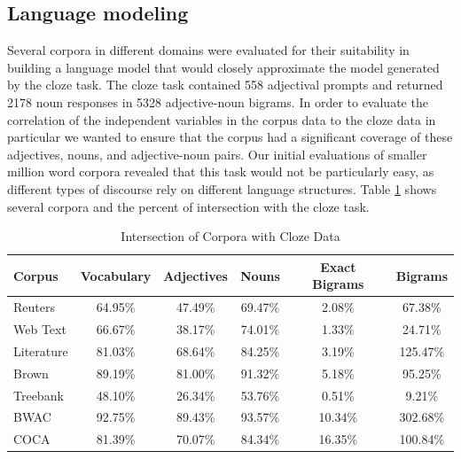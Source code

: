 \documentclass{article}
\begin{document}
\subsection{Language modeling}

Several corpora in different domains were evaluated for their suitability in building a language model that would closely approximate the model generated by the cloze task. The cloze task contained 558 adjectival prompts and returned 2178 noun responses in 5328 adjective-noun bigrams. In order to evaluate the correlation of the independent variables in the corpus data to the cloze data in particular we wanted to ensure that the corpus had a significant coverage of these adjectives, nouns, and adjective-noun pairs. Our initial evaluations of smaller million word corpora revealed that this task would not be particularly easy, as different types of discourse rely on different language structures. Table \ref{tab:corpora_comparison} shows several corpora and the percent of intersection with the cloze task.

\begin{table}[t!]
    \centering
    \caption{Intersection of Corpora with Cloze Data}
    \label{tab:corpora_comparison}
    \begin{tabular}{l | c c c c c}
        \hline
        Corpus & Vocabulary & Adjectives & Nouns & Exact Bigrams & Bigrams \\
        \hline
        Reuters & 64.95\% & 47.49\% & 69.47\%& 2.08\% & 67.38\% \\
		Web Text & 66.67\% & 38.17\% & 74.01\% & 1.33\% & 24.71\% \\
		Literature & 81.03\% & 68.64\% & 84.25\% & 3.19\% & 125.47\% \\
		Brown & 89.19\% & 81.00\% & 91.32\% & 5.18\% & 95.25\% \\
		Treebank & 48.10\% & 26.34\% & 53.76\% & 0.51\% & 9.21\% \\
		BWAC & 92.75\% & 89.43\% & 93.57\% & 10.34\% & 302.68\% \\
		COCA & 81.39\% & 70.07\% & 84.34\% & 16.35\% & 100.84\% \\
        \hline
    \end{tabular}
\end{table}
\end{document}
